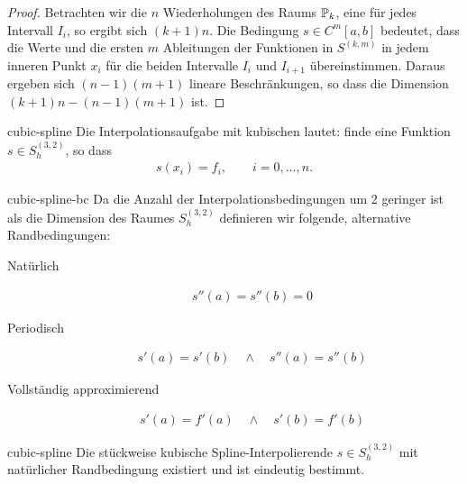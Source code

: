 \begin{proof}
  Betrachten wir die $n$ Wiederholungen des Raums $\P_k$, eine für
  jedes Intervall $I_i$, so ergibt sich $(k+1)n$.  Die Bedingung
  $s\in C^m[a,b]$ bedeutet, dass die Werte und die ersten $m$
  Ableitungen der Funktionen in $S^{(k,m)}$ in jedem inneren Punkt
  $x_i$ für die beiden Intervalle $I_i$ und $I_{i+1}$
  übereinstimmen. Daraus ergeben sich $(n-1)(m+1)$ lineare
  Beschränkungen, so dass die Dimension $(k+1)n - (n-1)(m+1)$ ist.
\end{proof}

\begin{Definition}{cubic-spline}
  Die Interpolationsaufgabe mit kubischen  lautet:
  finde eine Funktion $s\in S_h^{(3,2)}$, so dass
  \begin{gather}
    s(x_i) = f_i,\qquad i=0,\dots,n.
  \end{gather}
\end{Definition}

\begin{Definition}{cubic-spline-bc}
  Da die Anzahl der Interpolationsbedingungen um 2 geringer ist als
  die Dimension des Raumes $S_h^{(3,2)}$ definieren wir folgende,
  alternative Randbedingungen:
  \begin{description}
  \item[Natürlich]
    \begin{gather}
      s''(a) = s''(b) = 0
    \end{gather}
  \item[Periodisch]
    \begin{gather}
      s'(a) = s'(b) \quad \wedge \quad s''(a) = s''(b)
    \end{gather}
  \item[Vollständig approximierend]
    \begin{gather}
      s'(a) = f'(a) \quad \wedge \quad s'(b) = f'(b)
    \end{gather}
  \end{description}
\end{Definition}

\begin{Satz}{cubic-spline}
  Die stückweise kubische Spline-Interpolierende $s\in S_h^{(3,2)}$
  mit natürlicher Randbedingung existiert und ist eindeutig bestimmt.
\end{Satz}


